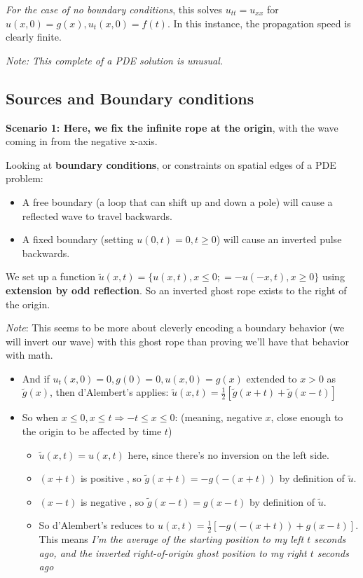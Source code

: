 \documentclass[11pt, oneside]{article}   	%
\begin{document}

\emph{For the case of no boundary conditions}, this solves $u_{tt} = u_{xx}$ for $u(x,0) = g(x), u_t(x,0) = f(t)$.  In this instance, the propagation speed is clearly finite.

\emph{Note: This complete of a PDE solution is unusual.}

\subsection{Sources and Boundary conditions}

\textbf{Scenario 1: Here, we fix the infinite rope at the origin}, with the wave coming in from the negative x-axis.

Looking at \textbf{boundary conditions}, or constraints on spatial edges of a PDE problem:
\begin{itemize}
\item A free boundary (a loop that can shift up and down a pole) will cause a reflected wave to travel backwards.
\item A fixed boundary (setting $u(0, t) = 0, t \geq 0$) will cause an inverted pulse backwards.  
\end{itemize}

We set up a function $\tilde{u}(x,t) = \{ u(x,t), x \leq 0; = -u(-x, t), x \geq 0\}$ using \textbf{extension by odd reflection}.  So an inverted ghost rope exists to the right of the origin.

\emph{Note}: This seems to be more about cleverly encoding a boundary behavior (we will invert our wave) with this ghost rope than proving we'll have that behavior with math.

\begin{itemize}
\item And if $u_t(x,0) = 0, g(0) = 0, u(x,0) = g(x)$ extended to $x > 0$ as $\tilde{g}(x)$, then d'Alembert's applies: $\tilde{u}(x,t) = \frac{1}{2}[\tilde{g}(x+t) + \tilde{g}(x-t)]$
\item So when $x \leq 0, x \leq t \Rightarrow -t \leq x \leq 0$: (meaning, negative $x$, close enough to the origin to be affected by time $t$)
\begin{itemize}
\item $\tilde{u}(x,t) = u(x,t)$ here, since there's no inversion on the left side.
\item $(x+t)$ is positive , so $\tilde{g}(x+t) = -g(-(x+t))$ by definition of $\tilde{u}$.
\item $(x-t)$ is negative , so $\tilde{g}(x-t) = g(x-t)$ by definition of $\tilde{u}$.
\item So d'Alembert's reduces to $u(x,t) = \frac{1}{2} [-g(-(x+t)) + g(x-t)]$.  This means \emph{I'm the average of the starting position to my left $t$ seconds ago, and the inverted right-of-origin ghost position to my right $t$ seconds ago}
\end{itemize}
\end{itemize}
\end{document}
